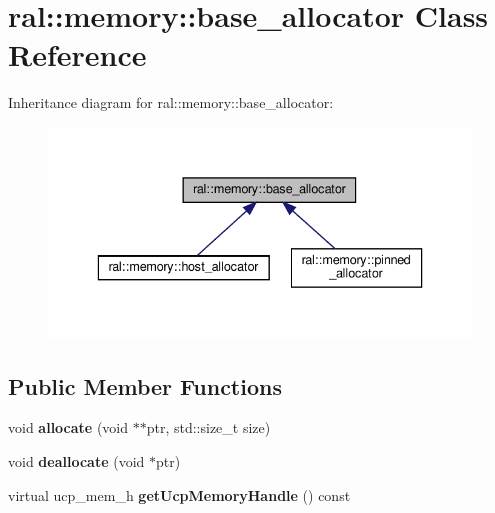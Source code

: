 \hypertarget{classral_1_1memory_1_1base__allocator}{}\section{ral\+:\+:memory\+:\+:base\+\_\+allocator Class Reference}
\label{classral_1_1memory_1_1base__allocator}


Inheritance diagram for ral\+:\+:memory\+:\+:base\+\_\+allocator\+:\nopagebreak
\begin{figure}[H]
\begin{center}
\leavevmode
\includegraphics[width=336pt]{classral_1_1memory_1_1base__allocator__inherit__graph}
\end{center}
\end{figure}
\subsection*{Public Member Functions}
\begin{DoxyCompactItemize}
\item 
\mbox{\label{classral_1_1memory_1_1base__allocator_af9f28272471b5c21700ec726703091db}} 
void {\bfseries allocate} (void $\ast$$\ast$ptr, std\+::size\+\_\+t size)
\item 
\mbox{\label{classral_1_1memory_1_1base__allocator_a5e5f35c397e7c906ca9e9c7b3aaaa473}} 
void {\bfseries deallocate} (void $\ast$ptr)
\item 
\mbox{\label{classral_1_1memory_1_1base__allocator_a9be5143f73c55fc9b30b270ada544b01}} 
virtual ucp\+\_\+mem\+\_\+h {\bfseries get\+Ucp\+Memory\+Handle} () const
\end{DoxyCompactItemize}
